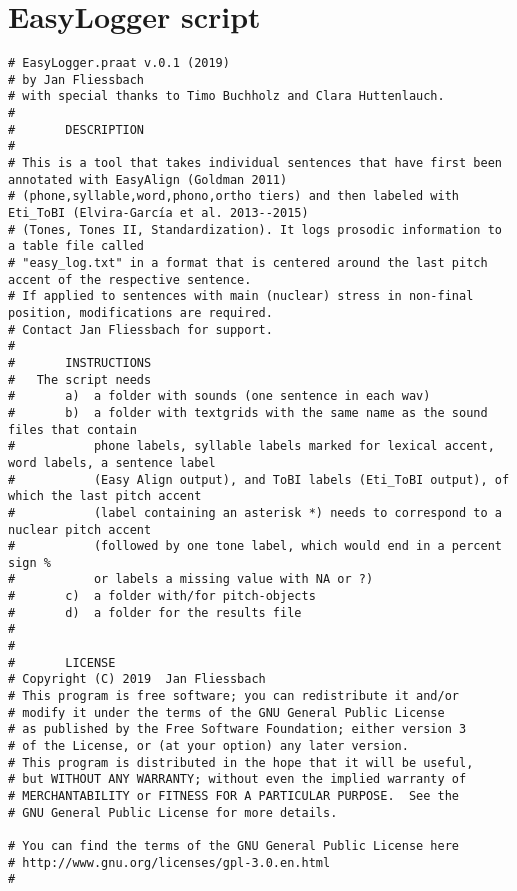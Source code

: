 
\chapter{EasyLogger script}



\begin{Verbatim}[fontsize=\tiny]
# EasyLogger.praat v.0.1 (2019)
# by Jan Fliessbach
# with special thanks to Timo Buchholz and Clara Huttenlauch. 
#
#		DESCRIPTION
#
# This is a tool that takes individual sentences that have first been annotated with EasyAlign (Goldman 2011) 
# (phone,syllable,word,phono,ortho tiers) and then labeled with Eti_ToBI (Elvira-García et al. 2013--2015)
# (Tones, Tones II, Standardization). It logs prosodic information to a table file called 
# "easy_log.txt" in a format that is centered around the last pitch accent of the respective sentence.
# If applied to sentences with main (nuclear) stress in non-final position, modifications are required.
# Contact Jan Fliessbach for support.
#
#		INSTRUCTIONS
#	The script needs 
#		a)	a folder with sounds (one sentence in each wav)
#		b)	a folder with textgrids with the same name as the sound files that contain
#			phone labels, syllable labels marked for lexical accent, word labels, a sentence label 
#			(Easy Align output), and ToBI labels (Eti_ToBI output), of which the last pitch accent 
#			(label containing an asterisk *) needs to correspond to a nuclear pitch accent 
#			(followed by one tone label, which would end in a percent sign % 
#			or labels a missing value with NA or ?)
#		c)	a folder with/for pitch-objects
#		d)	a folder for the results file
#
#
#		LICENSE
# Copyright (C) 2019  Jan Fliessbach
# This program is free software; you can redistribute it and/or
# modify it under the terms of the GNU General Public License
# as published by the Free Software Foundation; either version 3
# of the License, or (at your option) any later version.
# This program is distributed in the hope that it will be useful,
# but WITHOUT ANY WARRANTY; without even the implied warranty of
# MERCHANTABILITY or FITNESS FOR A PARTICULAR PURPOSE.  See the
# GNU General Public License for more details.

# You can find the terms of the GNU General Public License here
# http://www.gnu.org/licenses/gpl-3.0.en.html
#



\end{Verbatim}
